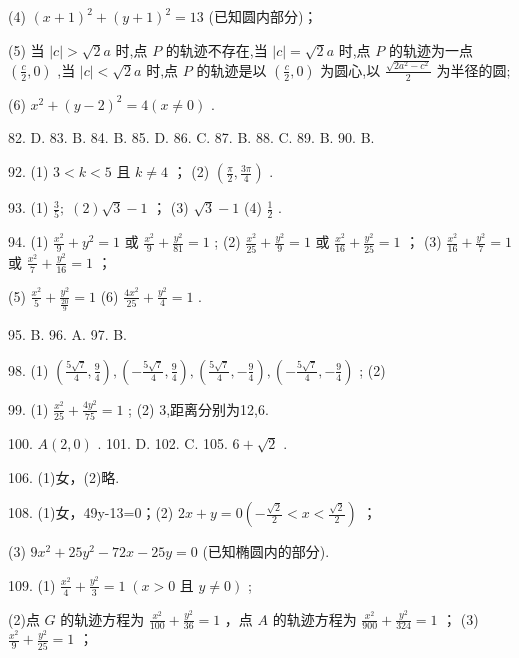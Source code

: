 \documentclass[10pt]{article}
\begin{document}
(4) \({\left( x + 1\right) }^{2} + {\left( y + 1\right) }^{2} = {13}\) (已知圆内部分)；

(5) 当 \(\left| c\right|  > \sqrt{2}a\) 时,点 \(P\) 的轨迹不存在,当 \(\left| c\right|  = \sqrt{2}a\) 时,点 \(P\) 的轨迹为一点 \(\left( {\frac{c}{2},0}\right)\) ,当 \(\left| c\right|  < \sqrt{2}a\) 时,点 \(P\) 的轨迹是以 \(\left( {\frac{c}{2},0}\right)\) 为圆心,以 \(\frac{\sqrt{2{a}^{2} - {c}^{2}}}{2}\) 为半径的圆;

(6) \({x}^{2} + {\left( y - 2\right) }^{2} = 4\left( {x \neq  0}\right)\) .

82. D. 83. B. 84. B. 85. D. 86. C. 87. B. 88. C. 89. B. 90. B.

92. (1) \(3 < k < 5\) 且 \(k \neq  4\) ； (2) \(\left( {\frac{\pi }{2},\frac{3\pi }{4}}\right)\) .

93. (1) \(\frac{3}{5};\;\left( 2\right) \sqrt{3} - 1\) ； (3) \(\sqrt{3} - 1\) (4) \(\frac{1}{2}\) .

94. (1) \(\frac{{x}^{2}}{9} + {y}^{2} = 1\) 或 \(\frac{{x}^{2}}{9} + \frac{{y}^{2}}{81} = 1\) ; (2) \(\frac{{x}^{2}}{25} + \frac{{y}^{2}}{9} = 1\) 或 \(\frac{{x}^{2}}{16} + \frac{{y}^{2}}{25} = 1\) ； (3) \(\frac{{x}^{2}}{16} + \frac{{y}^{2}}{7} = 1\) 或 \(\frac{{x}^{2}}{7} + \frac{{y}^{2}}{16} = 1\) ；

(5) \(\frac{{x}^{2}}{5} + \frac{{y}^{2}}{\frac{20}{9}} = 1\) (6) \(\frac{4{x}^{2}}{25} + \frac{{y}^{2}}{4} = 1\) .

95. B. 96. A. 97. B.

98. (1) \(\left( {\frac{5\sqrt{7}}{4},\frac{9}{4}}\right) ,\left( {-\frac{5\sqrt{7}}{4},\frac{9}{4}}\right) ,\left( {\frac{5\sqrt{7}}{4}, - \frac{9}{4}}\right) ,\left( {-\frac{5\sqrt{7}}{4}, - \frac{9}{4}}\right)\) ; (2)

99. (1) \(\frac{{x}^{2}}{25} + \frac{4{y}^{2}}{75} = 1\) ; (2) 3,距离分别为12,6.

100. \(A\left( {2,0}\right)\) . 101. D. 102. C. 105. \(6 + \sqrt{2}\) .

106. (1)女，(2)略.

108. (1)女，49y-13=0；(2) \({2x} + y = 0\left( {-\frac{\sqrt{2}}{2} < x < \frac{\sqrt{2}}{2}}\right)\) ；

(3) \(9{x}^{2} + {25}{y}^{2} - {72x} - {25y} = 0\) (已知椭圆内的部分).

109. (1) \(\frac{{x}^{2}}{4} + \frac{{y}^{2}}{3} = 1\;\left( {x > 0\text{ 且 }y \neq  0}\right)\) ;

(2)点 \(G\) 的轨迹方程为 \(\frac{{x}^{2}}{100} + \frac{{y}^{2}}{36} = 1\) ，点 \(A\) 的轨迹方程为 \(\frac{{x}^{2}}{900} + \frac{{y}^{2}}{324} = 1\) ； (3) \(\frac{{x}^{2}}{9} + \frac{{y}^{2}}{25} = 1\) ；
\end{document}
